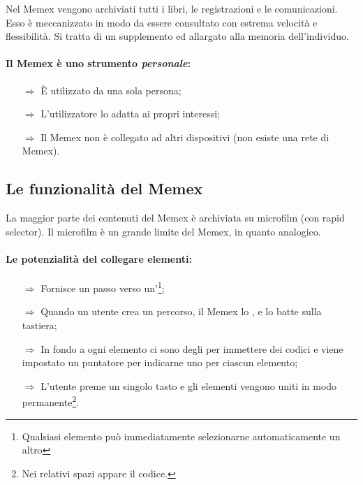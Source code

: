 Nel Memex vengono archiviati tutti i libri, le registrazioni e le comunicazioni.
Esso è meccanizzato in modo da essere consultato con estrema velocità e flessibilità.
Si tratta di un supplemento  ed allargato alla memoria dell'individuo.

\paragraph{Il Memex è uno strumento \textit{personale}:}

\begin{itemize}
    \item [$\Rightarrow$] È utilizzato da una sola persona;
    \item [$\Rightarrow$] L'utilizzatore lo adatta ai propri interessi;
    \item [$\Rightarrow$] Il Memex non è collegato ad altri dispositivi (non esiste una rete di Memex).
\end{itemize}



\subsection{Le funzionalità del Memex}

La maggior parte dei contenuti del Memex è archiviata su microfilm (con rapid selector).
Il microfilm è un grande limite del Memex, in quanto analogico.

\paragraph{Le potenzialità del collegare elementi:}

\begin{itemize}
    \item [$\Rightarrow$] Fornisce un passo verso un'\footnote{Qualsiasi elemento può immediatamente selezionarne automaticamente un altro};
    \item [$\Rightarrow$] Quando un utente crea un percorso, il Memex lo ,
     e lo batte sulla tastiera;
    \item [$\Rightarrow$] In fondo a ogni elemento ci sono degli  per immettere dei codici e viene impostato un puntatore per indicarne uno per ciascun elemento;
    \item [$\Rightarrow$] L'utente preme un singolo tasto e gli elementi vengono uniti in modo permanente\footnote{Nei relativi spazi appare il codice.}.
\end{itemize}

